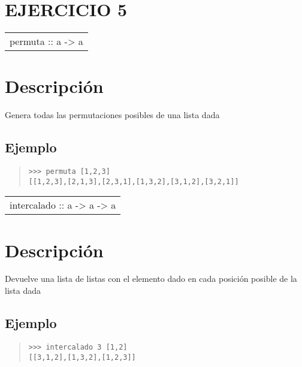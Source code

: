 \section{EJERCICIO 5}
\begin{haddockdesc}
\item[\begin{tabular}{@{}l}
permuta :: {\char 91}a{\char 93} -> {\char 91}{\char 91}a{\char 93}{\char 93}
\end{tabular}]
{\haddockbegindoc
\section*{Descripción}
Genera todas las permutaciones posibles de una lista dada\par
\subsection*{Ejemplo}
\begin{quote}
{\haddockverb\begin{verbatim}
>>> permuta [1,2,3]
[[1,2,3],[2,1,3],[2,3,1],[1,3,2],[3,1,2],[3,2,1]]

\end{verbatim}}
\end{quote}}
\end{haddockdesc}
\begin{haddockdesc}
\item[\begin{tabular}{@{}l}
intercalado :: a -> {\char 91}a{\char 93} -> {\char 91}{\char 91}a{\char 93}{\char 93}
\end{tabular}]
{\haddockbegindoc
\section*{Descripción}
Devuelve una lista de listas con el elemento dado en cada posición posible de la lista dada\par
\subsection*{Ejemplo}
\begin{quote}
{\haddockverb\begin{verbatim}
>>> intercalado 3 [1,2]
[[3,1,2],[1,3,2],[1,2,3]]

\end{verbatim}}
\end{quote}}
\end{haddockdesc}
